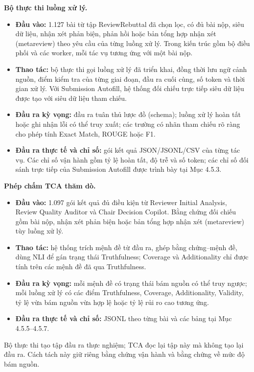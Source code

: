 \textbf{Bộ thực thi luồng xử lý.}

\begin{itemize}
  \item \textbf{Đầu vào:} 1.127 bài từ tập ReviewRebuttal đã chọn lọc, có đủ bài nộp, siêu dữ liệu, nhận xét phản biện, phản hồi hoặc bản tổng hợp nhận xét (metareview) theo yêu cầu của từng luồng xử lý. Trong kiến trúc gồm bộ điều phối và các worker, mỗi tác vụ tương ứng với một bài nộp.
  \item \textbf{Thao tác:} bộ thực thi gọi luồng xử lý đã triển khai, đồng thời lưu ngữ cảnh nguồn, điểm kiểm tra của từng giai đoạn, đầu ra cuối cùng, số token và thời gian xử lý. Với Submission Autofill, hệ thống đối chiếu trực tiếp siêu dữ liệu được tạo với siêu dữ liệu tham chiếu.
  \item \textbf{Đầu ra kỳ vọng:} đầu ra tuân thủ lược đồ (schema); luồng xử lý hoàn tất hoặc ghi nhận lỗi có thể truy xuất; các trường có nhãn tham chiếu rõ ràng cho phép tính Exact Match, ROUGE hoặc F1.
  \item \textbf{Đầu ra thực tế và chỉ số:} gói kết quả JSON/JSONL/CSV của từng tác vụ. Các chỉ số vận hành gồm tỷ lệ hoàn tất, độ trễ và số token; các chỉ số đối sánh trực tiếp của Submission Autofill được trình bày tại Mục 4.5.3.
\end{itemize}

\textbf{Phép chấm TCA thăm dò.}

\begin{itemize}
  \item \textbf{Đầu vào:} 1.097 gói kết quả đủ điều kiện từ Reviewer Initial Analysis, Review Quality Auditor và Chair Decision Copilot. Bằng chứng đối chiếu gồm bài nộp, nhận xét phản biện hoặc bản tổng hợp nhận xét (metareview) tùy luồng xử lý.
  \item \textbf{Thao tác:} hệ thống trích mệnh đề từ đầu ra, ghép bằng chứng--mệnh đề, dùng NLI để gán trạng thái Truthfulness; Coverage và Additionality chỉ được tính trên các mệnh đề đã qua Truthfulness.
  \item \textbf{Đầu ra kỳ vọng:} mỗi mệnh đề có trạng thái bám nguồn có thể truy ngược; mỗi luồng xử lý có các điểm Truthfulness, Coverage, Additionality, Validity, tỷ lệ vừa bám nguồn vừa hợp lệ hoặc tỷ lệ rủi ro cao tương ứng.
  \item \textbf{Đầu ra thực tế và chỉ số:} JSONL theo từng bài và các bảng tại Mục 4.5.5--4.5.7.
\end{itemize}

Bộ thực thi tạo tập đầu ra thực nghiệm; TCA đọc lại tập này mà không tạo lại đầu ra. Cách tách này giữ riêng bằng chứng vận hành và bằng chứng về mức độ bám nguồn.

